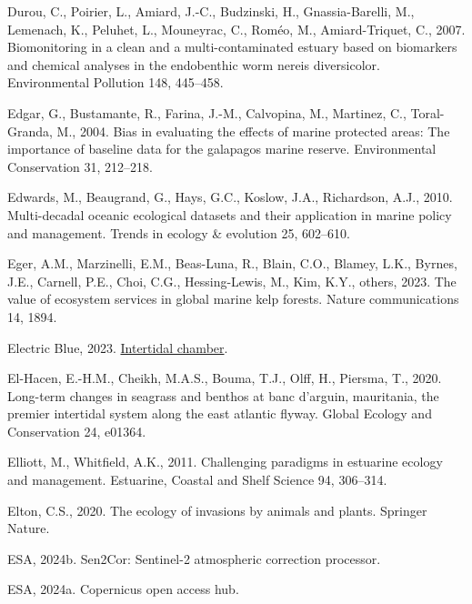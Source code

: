 \documentclass[
  letterpaper,
  11pt,
  english,
  singlespacing,
  headsepline]{MastersDoctoralThesis}
\newlength{\cslhangindent}
\newenvironment{CSLReferences}[2] %
 {\begin{list}{}{%
  \setlength{\itemindent}{0pt}
  \setlength{\leftmargin}{0pt}
  \setlength{\parsep}{0pt}
  \ifodd #1
   \setlength{\leftmargin}{\cslhangindent}
   \setlength{\itemindent}{-1\cslhangindent}
  \fi
  \setlength{\itemsep}{#2\baselineskip}}}
 {\end{list}}
\begin{document}
\begin{CSLReferences}{1}{0}
Durou, C., Poirier, L., Amiard, J.-C., Budzinski, H., Gnassia-Barelli,
M., Lemenach, K., Peluhet, L., Mouneyrac, C., Roméo, M., Amiard-Triquet,
C., 2007. Biomonitoring in a clean and a multi-contaminated estuary
based on biomarkers and chemical analyses in the endobenthic worm nereis
diversicolor. Environmental Pollution 148, 445--458.

Edgar, G., Bustamante, R., Farina, J.-M., Calvopina, M., Martinez, C.,
Toral-Granda, M., 2004. Bias in evaluating the effects of marine
protected areas: The importance of baseline data for the galapagos
marine reserve. Environmental Conservation 31, 212--218.

Edwards, M., Beaugrand, G., Hays, G.C., Koslow, J.A., Richardson, A.J.,
2010. Multi-decadal oceanic ecological datasets and their application in
marine policy and management. Trends in ecology \& evolution 25,
602--610.

Eger, A.M., Marzinelli, E.M., Beas-Luna, R., Blain, C.O., Blamey, L.K.,
Byrnes, J.E., Carnell, P.E., Choi, C.G., Hessing-Lewis, M., Kim, K.Y.,
others, 2023. The value of ecosystem services in global marine kelp
forests. Nature communications 14, 1894.

Electric Blue, 2023.
\href{https://electricblue.eu/intertidal-chamber}{Intertidal chamber}.

El-Hacen, E.-H.M., Cheikh, M.A.S., Bouma, T.J., Olff, H., Piersma, T.,
2020. Long-term changes in seagrass and benthos at banc d'arguin,
mauritania, the premier intertidal system along the east atlantic
flyway. Global Ecology and Conservation 24, e01364.

Elliott, M., Whitfield, A.K., 2011. Challenging paradigms in estuarine
ecology and management. Estuarine, Coastal and Shelf Science 94,
306--314.

Elton, C.S., 2020. The ecology of invasions by animals and plants.
Springer Nature.

ESA, 2024b. Sen2Cor: Sentinel-2 atmospheric correction processor.

ESA, 2024a. Copernicus open access hub.


\end{CSLReferences}
\end{document}
